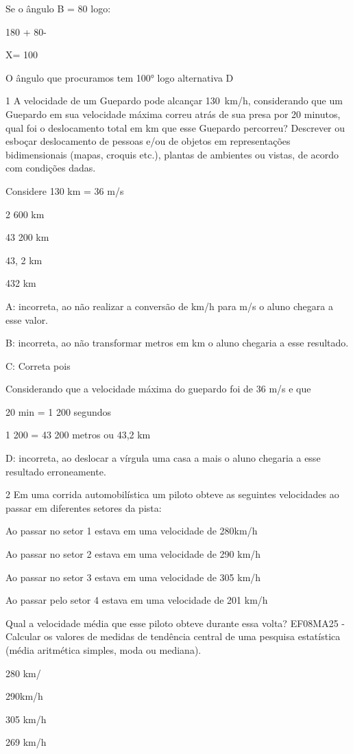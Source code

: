 Se o ângulo B = 80 logo:

180 + 80-

X= 100

O ângulo que procuramos tem 100° logo alternativa D

\num{1} A velocidade de um Guepardo pode alcançar 130~km/h, considerando que
um Guepardo em sua velocidade máxima correu atrás de sua presa por 20
minutos, qual foi o deslocamento total em km que esse Guepardo
percorreu? Descrever ou esboçar deslocamento de pessoas e/ou de objetos
em representações bidimensionais (mapas, croquis etc.), plantas de
ambientes ou vistas, de acordo com condições dadas.

Considere 130 km = 36 m/s

\item 2 600 km
\item 43 200 km
\item 43, 2 km
\item 432 km

A: incorreta, ao não realizar a conversão de km/h para m/s o aluno
chegara a esse valor.

B: incorreta, ao não transformar metros em km o aluno chegaria a esse
resultado.

C: Correta pois

Considerando que a velocidade máxima do guepardo foi de 36 m/s e que

20 min = 1 200 segundos

1 200 = 43 200 metros ou 43,2 km

D: incorreta, ao deslocar a vírgula uma casa a mais o aluno chegaria a
esse resultado erroneamente.

\num{2} Em uma corrida automobilística um piloto obteve as seguintes
velocidades ao passar em diferentes setores da pista:

Ao passar no setor 1 estava em uma velocidade de 280km/h

Ao passar no setor 2 estava em uma velocidade de 290 km/h

Ao passar no setor 3 estava em uma velocidade de 305 km/h

Ao passar pelo setor 4 estava em uma velocidade de 201 km/h

Qual a velocidade média que esse piloto obteve durante essa volta?
EF08MA25 - Calcular os valores de medidas de tendência central de uma
pesquisa estatística (média aritmética simples, moda ou mediana).

\item 280 km/
\item 290km/h
\item 305 km/h
\item 269 km/h

